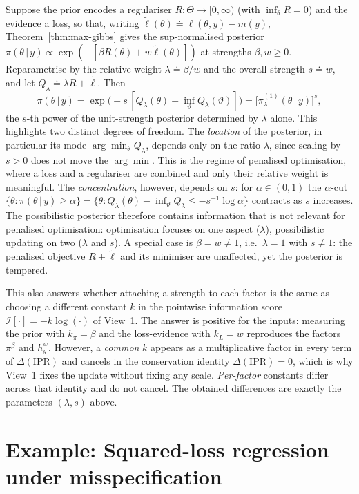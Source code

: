 \documentclass[accepted]{uai2026} %
\def\given{\,|\,}
\theoremstyle{remark}
\begin{document}
Suppose the prior encodes a regulariser $R:\Theta\to[0,\infty)$ (with $\inf_\theta R=0$) and the evidence a loss, so that, writing
$\tilde\ell(\theta)\doteq\ell(\theta,y)-m(y)$, Theorem~\ref{thm:max-gibbs} gives the sup-normalised posterior $\pi(\theta\given y)\propto\exp(-[\beta R(\theta)+w\tilde\ell(\theta)])$ at strengths $\beta,w\ge0$. Reparametrise by the relative weight $\lambda\doteq\beta/w$ and the overall strength $s\doteq w$, and let $Q_\lambda\doteq\lambda R+\tilde\ell$. Then
\[
  \pi(\theta\given y)
  =\exp\!\big(-s\,[Q_\lambda(\theta)-\textstyle\inf_\vartheta Q_\lambda(\vartheta)]\big)
  =\big[\pi^{(1)}_\lambda(\theta\given y)\big]^{s},
\]
the $s$-th power of the unit-strength posterior determined by $\lambda$ alone. This highlights two distinct degrees of freedom. The \emph{location} of the posterior, in particular its mode $\arg\min_\theta Q_\lambda$, depends only on the ratio $\lambda$, since scaling by $s > 0$ does not move the $\arg\min$. This is the regime of penalised optimisation, where a loss and a regulariser are combined and only their relative weight is meaningful. The \emph{concentration}, however, depends on $s$: for $\alpha\in(0,1)$ the $\alpha$-cut $\{\theta:\pi(\theta\given y)\ge\alpha\} = \{\theta:Q_\lambda(\theta)-\inf_\vartheta Q_\lambda\le -s^{-1}\log\alpha\}$ contracts as $s$ increases. The possibilistic posterior therefore contains information that is not relevant for penalised optimisation: optimisation focuses on one aspect ($\lambda$), possibilistic updating on two ($\lambda$ and $s$). A special case is $\beta=w\neq1$, i.e.\ $\lambda=1$ with $s\neq1$: the penalised objective $R+\tilde{\ell}$ and its minimiser are unaffected, yet the posterior is tempered.

This also answers whether attaching a strength to each factor is the same as choosing a different constant $k$ in the pointwise information score $\mathcal{I}[\cdot]=-k\log(\cdot)$ of View~1. The answer is positive for the inputs: measuring the prior with $k_\pi=\beta$ and the loss-evidence with $k_L=w$ reproduces the factors $\pi^\beta$ and $h_y^{w}$. However, a \emph{common} $k$ appears as a multiplicative factor in every term of $\Delta(\mathrm{IPR})$ and cancels in the conservation identity $\Delta(\mathrm{IPR})=0$, which is why View~1 fixes the update without fixing any scale. \emph{Per-factor} constants differ across that identity and do not cancel. The obtained differences are exactly the parameters $(\lambda,s)$ above.

\section{Example: Squared-loss regression under misspecification}
\label{sec:sq-loss-misspec}
\end{document}
